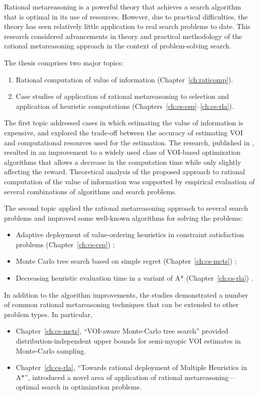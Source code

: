 Rational metareasoning is a powerful theory that achieves a search
algorithm that is optimal in its use of resources. However, due to
practical difficulties, the theory has seen relatively little
application to real search problems to date. This research considered
advancements in theory and practical methodology of the rational
metareasoning approach in the context of problem-solving search.

The thesis comprises two major topics:
\begin {enumerate}
\item Rational computation of value of information (Chapter~\ref{ch:raticomp}).
\item Case studies of application of rational metareasoning to
  selection and application of heuristic computations
  (Chapters~\ref{ch:cs-csp}--\ref{ch:cs-rla}). 
\end {enumerate}

The first topic addressed cases in which estimating the value of
information is expensive, and explored the trade-off between the
accuracy of estimating VOI and computational resources used for the
estimation. The research, published in \cite{TolpinShimony.raticomp},
resulted in an improvement to a widely used class of VOI-based
optimization algorithms that allows a decrease in the computation time
while only slightly affecting the reward. Theoretical analysis of the
proposed approach to rational computation of the value of information
was supported by empirical evaluation of several combinations of
algorithms and search problems.

The second topic applied the rational metareasoning approach to
several search problems and improved some well-known algorithms for
solving the problems: 
\begin {itemize}
\item Adaptive deployment of value-ordering heuristics in constraint
  satisfaction problems (Chapter~\ref{ch:cs-csp}) \cite{TolpinShimony.csp};
\item Monte Carlo tree search based on simple regret
  (Chapter~\ref{ch:cs-mcts})
  \cite{TolpinShimony.mcts,HayRussellTolpinShimony.selecting}; 
\item Decreasing heuristic evaluation time in a variant of A*
  (Chapter~\ref{ch:cs-rla}) \cite{TolpinEtAl.rla}. 
\end {itemize}
In addition to the algorithm improvements, the studies demonstrated a
number of common rational metareasoning techniques that can be 
extended to other problem types. In particular,
\begin{itemize}
\item Chapter~\ref{ch:cs-mcts}, ``VOI-aware Monte-Carlo tree search''
provided distribution-independent upper bounds for semi-myopic VOI
estimates in Monte-Carlo sampling.
\item Chapter~\ref{ch:cs-rla}, ``Towards rational deployment of Multiple
Heuristics in A*'', introduced a novel area of application of rational
metareasoning---optimal search in optimization problems.
\end{itemize}

